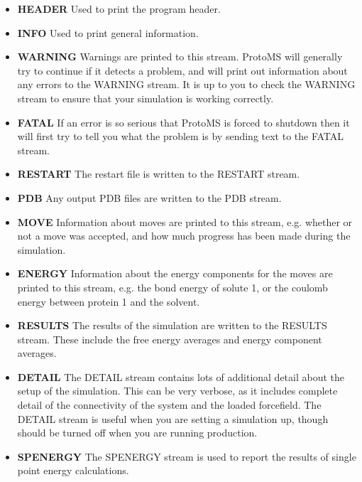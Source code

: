 \documentclass[letterpaper,10pt,english]{manual}
\begin{document}
\begin{itemize}
\item {} 
\textbf{HEADER} Used to print the program header.

\item {} 
\textbf{INFO} Used to print general information.

\item {} 
\textbf{WARNING} Warnings are printed to this stream. ProtoMS will generally try to continue if it detects a problem, and will print out information about any errors to the WARNING stream. It is up to you to check the WARNING stream to ensure that your simulation is working correctly.

\item {} 
\textbf{FATAL} If an error is so serious that ProtoMS is forced to shutdown then it will first try to tell you what the problem is by sending text to the FATAL stream.

\item {} 
\textbf{RESTART} The restart file is written to the RESTART stream.

\item {} 
\textbf{PDB} Any output PDB files are written to the PDB stream.

\item {} 
\textbf{MOVE} Information about moves are printed to this stream, e.g. whether or not a move was accepted, and how much progress has been made during the simulation.

\item {} 
\textbf{ENERGY} Information about the energy components for the moves are printed to this stream, e.g. the bond energy of solute 1, or the coulomb energy between protein 1 and the solvent.

\item {} 
\textbf{RESULTS} The results of the simulation are written to the RESULTS stream. These include the free energy averages and energy component averages.

\item {} 
\textbf{DETAIL} The DETAIL stream contains lots of additional detail about the setup of the simulation. This can be very verbose, as it includes complete detail of the connectivity of the system and the loaded forcefield. The DETAIL stream is useful when you are setting a simulation up, though should be turned off when you are running production.

\item {} 
\textbf{SPENERGY} The SPENERGY stream is used to report the results of single point energy calculations.


\end{itemize}
\end{document}
